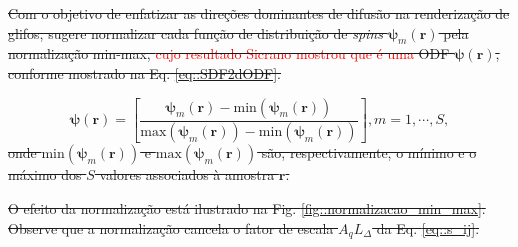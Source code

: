 \documentclass[
    12pt,                %
    oneside,            %
    a4paper,            %
    english,            %
    french,                %
    spanish,            %
    brazil                %
    ]{abntex2}
\begin{document}
\sout{
Com o objetivo de enfatizar as direções dominantes de difusão na renderização de glifos,  sugere normalizar cada função de distribuição de \textit{spins} $\boldsymbol{\psi}_m(\mathbf{r})$ pela normalização min-max, \textcolor{red}{cujo resultado Sicrano \cite{???} mostrou que é uma} ODF $\boldsymbol{\psi}(\mathbf{r})$\sout{, conforme mostrado na Eq. \ref{eq::SDF2dODF}.} 
}

\begin{equation}
\label{eq::SDF2dODF}
    \boldsymbol{\psi}(\mathbf{r}) = [ \frac{\boldsymbol{\psi}_m(\mathbf{r}) - \text{min}(\boldsymbol{\psi}_m(\mathbf{r}))}{\text{max}(\boldsymbol{\psi}_m(\mathbf{r})) - \text{min}(\boldsymbol{\psi}_m(\mathbf{r}))}], m = 1, \cdots, S ,
\end{equation}
\sout{onde $\text{min}(\boldsymbol{\psi}_m(\mathbf{r}))$ e $\text{max}(\boldsymbol{\psi}_m(\mathbf{r}))$ são, respectivamente, o mínimo e o máximo dos $S$ valores associados à amostra $\mathbf{r}$.}

\sout{
O efeito da normalização está ilustrado na Fig. \ref{fig::normalizacao_min_max}. Observe que a normalização cancela o fator de escala $A_qL_{\Delta}$ da Eq. \ref{eq::s_ij}.
}

\end{document}
